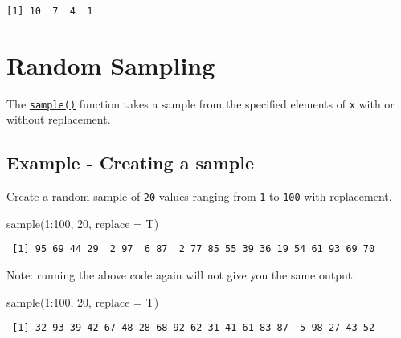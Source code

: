 \documentclass[
  letterpaper,
  DIV=11,
  numbers=noendperiod]{scrreprt}
\newenvironment{Shaded}{\begin{snugshade}}{\end{snugshade}}
\newcommand{\AttributeTok}[1]{\textcolor[rgb]{0.40,0.45,0.13}{#1}}
\newcommand{\DecValTok}[1]{\textcolor[rgb]{0.68,0.00,0.00}{#1}}
\newcommand{\FunctionTok}[1]{\textcolor[rgb]{0.28,0.35,0.67}{#1}}
\newcommand{\NormalTok}[1]{\textcolor[rgb]{0.00,0.23,0.31}{#1}}
\newcommand{\SpecialCharTok}[1]{\textcolor[rgb]{0.37,0.37,0.37}{#1}}
\begin{document}
\begin{verbatim}
[1] 10  7  4  1
\end{verbatim}

\section*{Random Sampling}\label{random-sampling}


The \href{https://rdrr.io/r/base/sample.html}{\texttt{sample()}}
function takes a sample from the specified elements of \texttt{x} with
or without replacement.

\subsection*{Example - Creating a
sample}\label{example---creating-a-sample}

Create a random sample of \texttt{20} values ranging from \texttt{1} to
\texttt{100} with replacement.

\begin{Shaded}
\begin{Highlighting}[]
\FunctionTok{sample}\NormalTok{(}\DecValTok{1}\SpecialCharTok{:}\DecValTok{100}\NormalTok{, }\DecValTok{20}\NormalTok{, }\AttributeTok{replace =}\NormalTok{ T)}
\end{Highlighting}
\end{Shaded}

\begin{verbatim}
 [1] 95 69 44 29  2 97  6 87  2 77 85 55 39 36 19 54 61 93 69 70
\end{verbatim}

Note: running the above code again will not give you the same output:

\begin{Shaded}
\begin{Highlighting}[]
\FunctionTok{sample}\NormalTok{(}\DecValTok{1}\SpecialCharTok{:}\DecValTok{100}\NormalTok{, }\DecValTok{20}\NormalTok{, }\AttributeTok{replace =}\NormalTok{ T)}
\end{Highlighting}
\end{Shaded}

\begin{verbatim}
 [1] 32 93 39 42 67 48 28 68 92 62 31 41 61 83 87  5 98 27 43 52
\end{verbatim}
\end{document}
